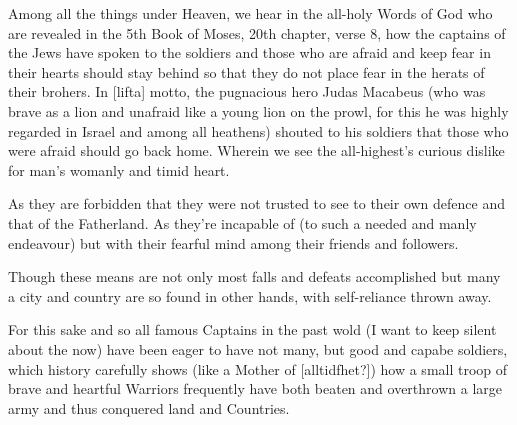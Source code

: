 \newpage


\newpage


Among all the things under Heaven, we hear in the all-holy Words of
God who are revealed in the 5th Book of Moses, 20th chapter,
verse 8, how the captains of the Jews have spoken to the soldiers and
those who are afraid and keep fear in their hearts should stay behind
so that they do not place fear in the herats of their brohers. In
[lifta] motto, the pugnacious hero Judas Macabeus (who was brave as a
lion and unafraid like a young lion on the prowl, for this he was
highly regarded in Israel and among all heathens) shouted to his
soldiers that those who were afraid should go back home. Wherein we
see the all-highest's curious dislike for man's womanly and timid
heart.

As they are forbidden that they were not trusted to see to their own
defence and that of the Fatherland. As they're incapable of (to such a
needed and manly endeavour) but with their fearful mind among their
friends and followers. 

Though these means are not only most falls and defeats accomplished
but many a city and country are so found in other hands, with
self-reliance thrown away.

For this sake and so all famous Captains in the past wold (I want to
keep silent about the now) have been eager to have not many, but good
and capabe soldiers, which history carefully shows (like a Mother of
[alltidfhet?]) how a small troop of brave and heartful Warriors
frequently have both beaten and overthrown a large army and thus
conquered land and Countries.
